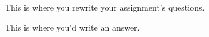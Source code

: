 \documentclass[11pt]{article}
\begin{document}
\begin{multicols}{2} %

\begin{question}
	This is where you rewrite your assignment's questions.
\end{question}

\begin{answer}
	This is where you'd write an answer.
\end{answer}


\end{multicols} %
\end{document}
